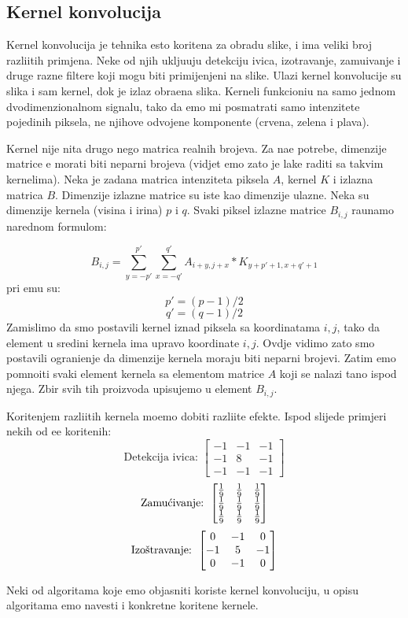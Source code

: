 \subsection{Kernel konvolucija} %
Kernel konvolucija je tehnika \ch esto kori\sh tena za obradu slike, i ima veliki broj razli\ch itih primjena. Neke od njih uklju\ch uju detekciju ivica, izo\sh travanje, zamu\cj ivanje i druge razne filtere koji mogu biti primijenjeni
na slike. Ulazi kernel konvolucije su slika i sam kernel, dok je izlaz obra\dj ena slika. Kerneli funkcioni\sh u na samo jednom dvodimenzionalnom signalu, tako da \cj emo mi posmatrati samo intenzitete pojedinih piksela, 
ne njihove odvojene komponente (crvena, zelena i plava).

Kernel nije ni\sh ta drugo nego matrica realnih brojeva. Za na\sh e potrebe, dimenzije matrice \cj e morati biti neparni brojeva (vidjet \cj emo za\sh to je lak\sh e raditi sa takvim kernelima). Neka je zadana matrica intenziteta
piksela $A$, kernel $K$ i izlazna matrica $B$. Dimenzije izlazne matrice su iste kao dimenzije ulazne. Neka su dimenzije kernela (visina i \sh irina) $p$ i $q$. Svaki piksel izlazne matrice $B_{i,j}$ ra\ch unamo narednom formulom:

\[
B_{i,j}=\sum_{y=-p'}^{p'}\sum_{x=-q'}^{q'}A_{i+y,j+x}*K_{y+p'+1,x+q'+1} %
\]
pri \ch emu su:
\[
p'=(p-1)/2
\]
\[
q'=(q-1)/2
\]
Zamislimo da smo postavili kernel iznad piksela sa koordinatama $i,j$, tako da element u sredini kernela ima upravo koordinate $i,j$. Ovdje vidimo za\sh to smo postavili ograni\ch enje da dimenzije kernela moraju biti neparni brojevi.
Zatim \cj emo pomno\zh iti svaki element kernela sa elementom matrice $A$ koji se nalazi ta\ch no ispod njega. Zbir svih tih proizvoda upisujemo u element $B_{i,j}$\cite{convolution}.

Kori\sh tenjem razli\ch itih kernela mo\zh emo dobiti razli\ch ite efekte. Ispod slijede primjeri nekih od \ch e\sh \cj e kori\sh tenih\cite{wikikernel}:
\vspace{10px} %
\[
\text{Detekcija ivica: } 
\begin{bmatrix}
-1 & -1 & -1 \\
-1 &  8 & -1 \\
-1 & -1 & -1
\end{bmatrix}
\]
\vspace{5px}
\[
\text{Zamu\cj ivanje: } 
\begin{bmatrix}
\frac{1}{9} & \frac{1}{9} & \frac{1}{9} \\
\frac{1}{9} &  \frac{1}{9} &\frac{1}{9} \\
\frac{1}{9} & \frac{1}{9} & \frac{1}{9}
\end{bmatrix}
\]
\vspace{5px}
\[
\text{Izo\sh travanje: } 
\begin{bmatrix}
0  & -1 &  0 \\
-1 &  5 & -1 \\
 0 & -1 &  0
\end{bmatrix}
\]

Neki od algoritama koje \cj emo objasniti koriste kernel konvoluciju, u opisu algoritama \cj emo navesti i konkretne kori\sh tene kernele.